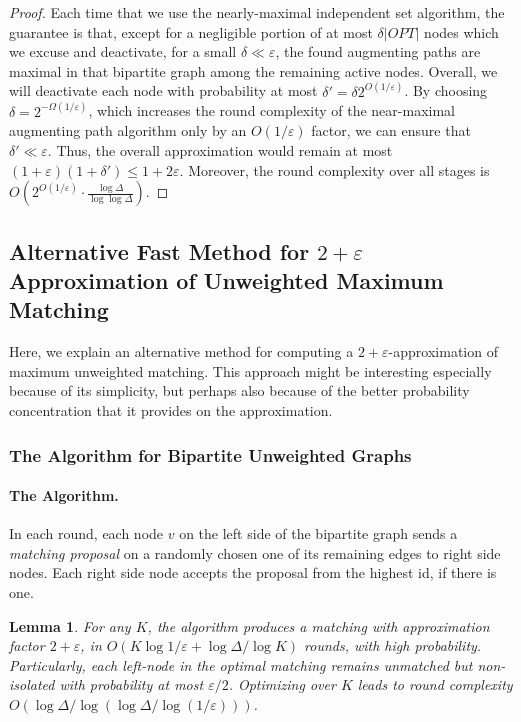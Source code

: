 \documentclass[11pt]{article}
\newtheorem{lemma}[theorem]{Lemma}
\newcommand{\eps}{\varepsilon}
\begin{document}
\begin{proof}
Each time that we use the nearly-maximal independent set algorithm, the guarantee is that, except for a negligible portion of at most $\delta |OPT|$ nodes which we excuse and deactivate, for a small $\delta \ll \eps$, the found augmenting paths are maximal in that bipartite graph among the remaining active nodes. Overall, we will deactivate each node with probability at most $\delta'=\delta 2^{O(1/\eps)}$. By choosing $\delta = 2^{-\Omega(1/\eps)}$, which increases the round complexity of the near-maximal augmenting path algorithm only by an $O(1/\eps)$ factor, we can ensure that $\delta'\ll \eps$. Thus, the overall approximation would remain at most $(1+\eps)(1+\delta') \leq 1+2\eps$.  Moreover, the round complexity over all stages is $O(2^{O(1/\eps)} \cdot \frac{\log \Delta}{\log\log \Delta})$.
\end{proof}


\subsection{Alternative Fast Method for $2+\eps$ Approximation of Unweighted Maximum Matching}
Here, we explain an alternative method for computing a $2+\eps$-approximation of maximum unweighted matching. This approach might be interesting especially because of its simplicity, but perhaps also because of the better probability concentration that it provides on the approximation.
\subsubsection{The Algorithm for Bipartite Unweighted Graphs}

\label{sec:2epsMMbipartite}
\paragraph{The Algorithm.} In each round, each node $v$ on the left side of the bipartite graph sends a \emph{matching proposal} on a randomly chosen one of its remaining edges to right side nodes. Each right side node accepts the proposal from the highest id, if there is one.

\begin{lemma} For any $K$, the algorithm produces a matching with approximation factor $2+\eps$, in $O(K\log 1/\eps+ \log \Delta/\log K)$ rounds, with high probability. Particularly, each left-node in the optimal matching remains unmatched but non-isolated with probability at most $\eps/2$. Optimizing over $K$ leads to round complexity $O(\log \Delta/\log(\log \Delta/\log(1/\eps)))$.
\end{lemma}
\end{document}
